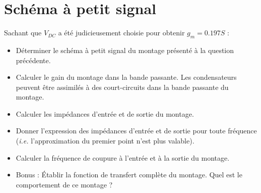 \documentclass{../template/tp}
\newcommand{\ifgv}[1]{\ifthenelse{\boolean{corrige}}{}{#1}} %
\begin{document}
\ifgv{\newpage}


\section{Schéma à petit signal}

\Question
{
Sachant que $V_{DC}$ a été judicieusement choisie pour obtenir $g_m=0.197S$ :
 
 \begin{itemize}
 \item Déterminer le schéma à petit signal du montage présenté à la question précédente.
 \item Calculer le gain du montage dans la bande passante. Les condensateurs peuvent être assimilés à des court-circuits dans la bande passante du montage.
 \item Calculer les impédances d'entrée et de sortie du montage.
 \item Donner l'expression des impédances d'entrée et de sortie pour toute fréquence (\textit{i.e.} l'approximation du premier point n'est plus valable).
 \item Calculer la fréquence de coupure à l'entrée et à la sortie du montage.
 \item Bonus : Établir la fonction de transfert complète du montage. Quel est le comportement de ce montage ?
 \end{itemize}

}
\end{document}
